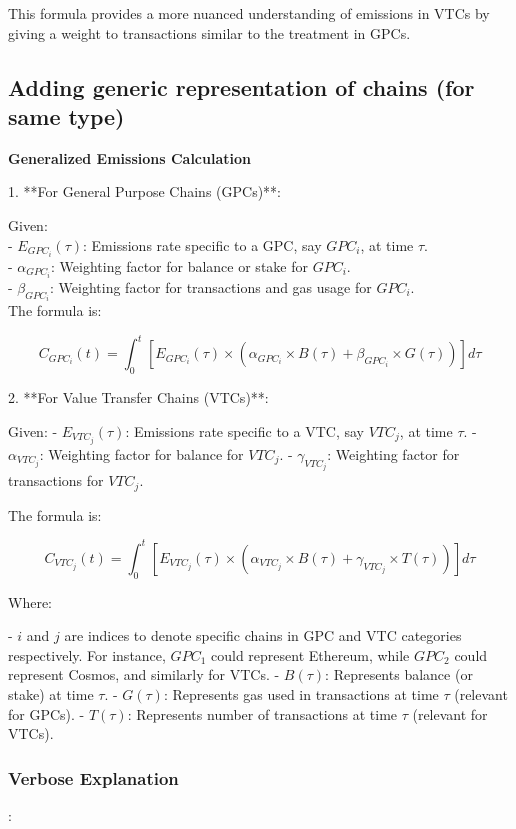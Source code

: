 \documentclass[12pt,a4paper]{report}
\begin{document}
This formula provides a more nuanced understanding of emissions in VTCs by giving a weight to transactions similar to the treatment in GPCs.

\subsection{Adding generic representation of chains (for same type)}

\textbf{Generalized Emissions Calculation}

1. **For General Purpose Chains (GPCs)**:

Given: \\
- \( E_{GPC_i}(\tau) \): Emissions rate specific to a GPC, say \( GPC_i \), at time \( \tau \). \\
- \( \alpha_{GPC_i} \): Weighting factor for balance or stake for \( GPC_i \). \\
- \( \beta_{GPC_i} \): Weighting factor for transactions and gas usage for \( GPC_i \). \\

The formula is:

\[ C_{GPC_i}(t) = \int_{0}^{t} [E_{GPC_i}(\tau) \times (\alpha_{GPC_i} \times B(\tau) + \beta_{GPC_i} \times G(\tau))] d\tau \]

2. **For Value Transfer Chains (VTCs)**:

Given:
- \( E_{VTC_j}(\tau) \): Emissions rate specific to a VTC, say \( VTC_j \), at time \( \tau \).
- \( \alpha_{VTC_j} \): Weighting factor for balance for \( VTC_j \).
- \( \gamma_{VTC_j} \): Weighting factor for transactions for \( VTC_j \).

The formula is:

\[ C_{VTC_j}(t) = \int_{0}^{t} [E_{VTC_j}(\tau) \times (\alpha_{VTC_j} \times B(\tau) + \gamma_{VTC_j} \times T(\tau))] d\tau \]

Where:

- \( i \) and \( j \) are indices to denote specific chains in GPC and VTC categories respectively. For instance, \( GPC_1 \) could represent Ethereum, while \( GPC_2 \) could represent Cosmos, and similarly for VTCs.
- \( B(\tau) \): Represents balance (or stake) at time \( \tau \).
- \( G(\tau) \): Represents gas used in transactions at time \( \tau \) (relevant for GPCs).
- \( T(\tau) \): Represents number of transactions at time \( \tau \) (relevant for VTCs).

\subsubsection{Verbose Explanation}:
\end{document}
